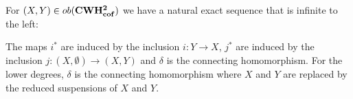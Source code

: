 \begin{theorem}\label{thm:kTheo-longExactSequence} For $(X,Y)\in ob(\operatorname{\mathbf{CWH^{2}_{cof}}})$ we have a natural exact sequence that is infinite to the left:
\begin{center}
\end{center} The maps $i^*$ are induced by the inclusion $i:Y\to X$, $j^*$ are induced by the inclusion $j: (X,\emptyset)\to (X,Y)$ and $\delta$ is the connecting homomorphism. For the lower degrees, $\delta$ is the connecting homomorphism where $X$ and $Y$ are replaced by the reduced suspensions of $X$ and $Y$. 	
\end{theorem}
